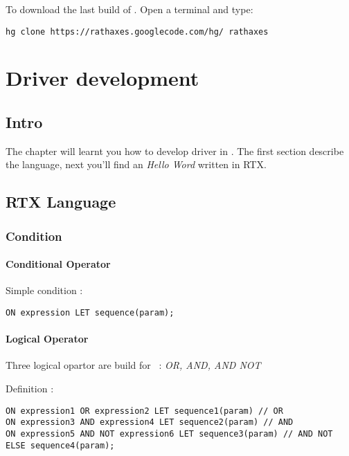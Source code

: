 \documentclass[american]{rtxreport}
\begin{document}
To download the last build of \rtx. Open a terminal and type:

\begin{verbatim}
hg clone https://rathaxes.googlecode.com/hg/ rathaxes
\end{verbatim}


\chapter{Driver development}

\section{Intro}

The chapter will learnt you how to develop driver in \rtx.
The first section describe the language, next you'll find an \emph{Hello Word} written in RTX.


\section{RTX Language}

\subsection{Condition}


\subsubsection{Conditional Operator}

Simple condition :

\begin{lstlisting}
ON expression LET sequence(param);
\end{lstlisting}


\subsubsection{Logical Operator}


Three logical opartor are build for \rtx\ : \emph{OR, AND, AND NOT}


Definition :
\begin{lstlisting}
ON expression1 OR expression2 LET sequence1(param) // OR
ON expression3 AND expression4 LET sequence2(param) // AND
ON expression5 AND NOT expression6 LET sequence3(param) // AND NOT
ELSE sequence4(param);
\end{lstlisting}
\end{document}
